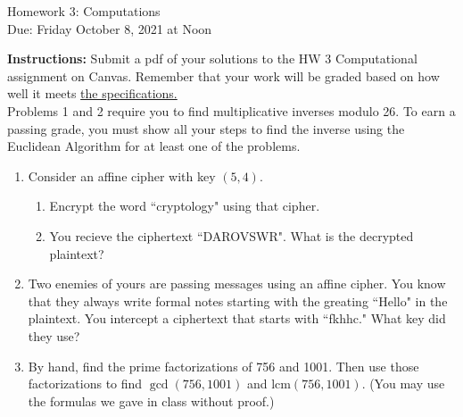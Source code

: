 \documentclass[10pt,a4paper]{article}
\begin{document}
\begin{center}
{\Large Homework 3: Computations}\\
Due: Friday October 8, 2021 at Noon\\


\end{center}
{\bf Instructions:} Submit a pdf of your solutions to the HW 3 Computational assignment on Canvas. Remember that your work will be graded based on how well it meets \href{https://docs.google.com/document/d/1emM06_WRh_h941rsjtRE9fRVndJtfRKd9gyS3Fs_rFA/edit?usp=sharing}{the specifications. }
\\[1em]

 Problems 1 and 2 require you to find multiplicative inverses modulo 26. To earn a passing grade, you must show all your steps to find the inverse using the Euclidean Algorithm for at least one of the problems. 
 
\begin{enumerate}
\item Consider an affine cipher with key $(5,4)$. 
\begin{enumerate}
\item Encrypt the word ``cryptology" using that cipher. 
\item You recieve the ciphertext ``DAROVSWR". What is the decrypted plaintext?
\end{enumerate}

\item Two enemies of yours are passing messages using an affine cipher. You know that they always write formal notes starting with the greating ``Hello" in the plaintext.  You intercept a ciphertext that starts with ``fkhhc." What key did they use?

\item By hand, find the prime factorizations of 756 and 1001. Then use those factorizations to find $\gcd(756, 1001)$ and $\mathrm{lcm}(756, 1001)$. (You may use the formulas we gave in class without proof.) 

\end{enumerate}
\end{document}
